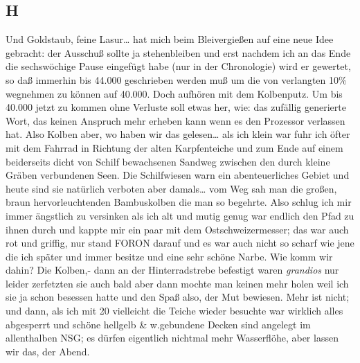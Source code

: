 \documentclass[
]{article}
\author{}
\date{\vspace{-2.5em}}
\begin{document}
\subsection{H}\label{h}

Und Goldstaub, feine Lasur\ldots{} hat mich beim Bleivergießen auf eine
neue Idee gebracht: der Ausschuß sollte ja stehenbleiben und erst
nachdem ich an das Ende die sechswöchige Pause eingefügt habe (nur in
der Chronologie) wird er gewertet, so daß immerhin bis 44.000
geschrieben werden muß um die von verlangten 10\% wegnehmen zu können
auf 40.000. Doch aufhören mit dem Kolbenputz. Um bis 40.000 jetzt zu
kommen ohne Verluste soll etwas her, wie: das zufällig generierte Wort,
das keinen Anspruch mehr erheben kann wenn es den Prozessor verlassen
hat. Also Kolben aber, wo haben wir das gelesen\ldots{} als ich klein
war fuhr ich öfter mit dem Fahrrad in Richtung der alten Karpfenteiche
und zum Ende auf einem beiderseits dicht von Schilf bewachsenen Sandweg
zwischen den durch kleine Gräben verbundenen Seen. Die Schilfwiesen warn
ein abenteuerliches Gebiet und heute sind sie natürlich verboten aber
damals\ldots{} vom Weg sah man die großen, braun hervorleuchtenden
Bambuskolben die man so begehrte. Also schlug ich mir immer ängstlich zu
versinken als ich alt und mutig genug war endlich den Pfad zu ihnen
durch und kappte mir ein paar mit dem Ostschweizermesser; das war auch
rot und griffig, nur stand FORON darauf und es war auch nicht so scharf
wie jene die ich später und immer besitze und eine sehr schöne Narbe.
Wie komm wir dahin? Die Kolben,- dann an der Hinterradstrebe befestigt
waren \emph{grandios} nur leider zerfetzten sie auch bald aber dann
mochte man keinen mehr holen weil ich sie ja schon besessen hatte und
den Spaß also, der Mut bewiesen. Mehr ist nicht; und dann, als ich mit
20 vielleicht die Teiche wieder besuchte war wirklich alles abgesperrt
und schöne hellgelb \& w.gebundene Decken sind angelegt im allenthalben
NSG; es dürfen eigentlich nichtmal mehr Wasserflöhe, aber lassen wir
das, der Abend.
\end{document}
